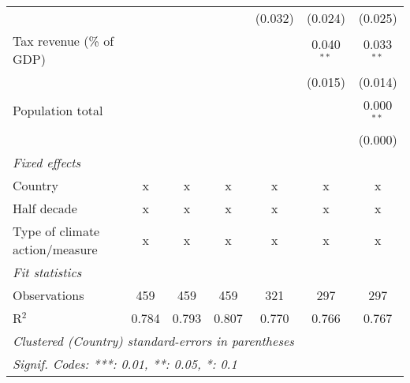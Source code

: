 \begin{tabular}{lcccccc}
                                                           &         &                &                & (0.032)        & (0.024)        & (0.025)\\   
   Tax revenue (\% of GDP)                                 &         &                &                &                & 0.040$^{**}$   & 0.033$^{**}$\\   
                                                           &         &                &                &                & (0.015)        & (0.014)\\   
   Population total                                        &         &                &                &                &                & 0.000$^{**}$\\   
                                                           &         &                &                &                &                & (0.000)\\   
   \emph{Fixed effects}\\
   Country                                                 & x       & x              & x              & x              & x              & x\\  
   Half decade                                             & x       & x              & x              & x              & x              & x\\  
   Type of climate action/measure                          & x       & x              & x              & x              & x              & x\\  
   \midrule \emph{Fit statistics}\\
   Observations                                            & 459     & 459            & 459            & 321            & 297            & 297\\  
   R$^2$                                                   & 0.784   & 0.793          & 0.807          & 0.770          & 0.766          & 0.767\\  
   \midrule
   \multicolumn{7}{l}{\emph{Clustered (Country) standard-errors in parentheses}}\\
   \multicolumn{7}{l}{\emph{Signif. Codes: ***: 0.01, **: 0.05, *: 0.1}}\\
\end{tabular}
\par\endgroup


